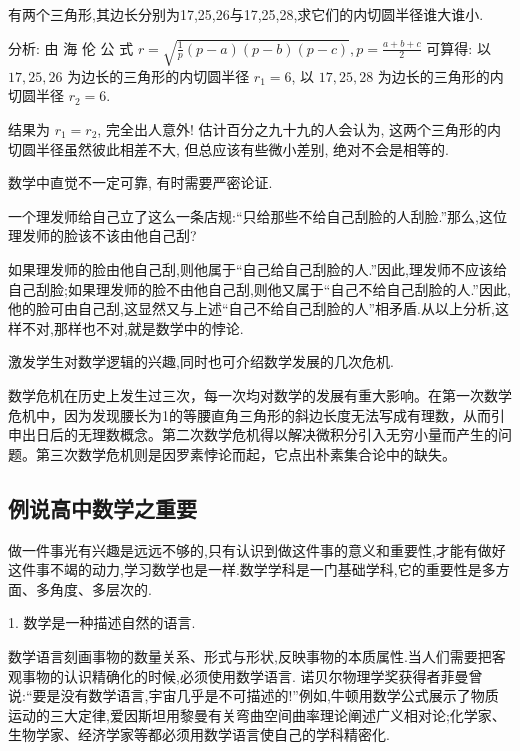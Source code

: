 \begin{example}[几何直觉]
	有两个三角形,其边长分别为17,25,26与17,25,28,求它们的内切圆半径谁大谁小.

	分析: 由 海 伦 公 式 $r=\sqrt{\frac{1}{p}(p-a)(p-b)(p-c)}, p=\frac{a+b+c}{2}$ 可算得: 以 $17,25,26$ 为边长的三角形的内切圆半径 $r_1=6$, 以 $17,25,28$ 为边长的三角形的内切圆半径 $r_2=6$.

	结果为 $r_1=r_2$, 完全出人意外! 估计百分之九十九的人会认为, 这两个三角形的内切圆半径虽然彼此相差不大, 但总应该有些微小差别, 绝对不会是相等的.
\end{example}
\begin{purpose}
	数学中直觉不一定可靠, 有时需要严密论证.
\end{purpose}

\begin{example}[数学悖论]
	一个理发师给自己立了这么一条店规:“只给那些不给自己刮脸的人刮脸.”那么,这位理发师的脸该不该由他自己刮?

	如果理发师的脸由他自己刮,则他属于“自己给自己刮脸的人.”因此,理发师不应该给自己刮脸;如果理发师的脸不由他自己刮,则他又属于“自己不给自己刮脸的人.”因此,他的脸可由自己刮,这显然又与上述“自己不给自己刮脸的人”相矛盾.从以上分析,这样不对,那样也不对,就是数学中的悖论.
\end{example}
\begin{purpose}
	激发学生对数学逻辑的兴趣,同时也可介绍数学发展的几次危机.
\end{purpose}
\begin{note}
	数学危机在历史上发生过三次，每一次均对数学的发展有重大影响。在第一次数学危机中，因为发现腰长为1的等腰直角三角形的斜边长度无法写成有理数，从而引申出日后的无理数概念。第二次数学危机得以解决微积分引入无穷小量而产生的问题。第三次数学危机则是因罗素悖论而起，它点出朴素集合论中的缺失。
\end{note}
\subsection{例说高中数学之重要}
做一件事光有兴趣是远远不够的,只有认识到做这件事的意义和重要性,才能有做好这件事不竭的动力,学习数学也是一样.数学学科是一门基础学科,它的重要性是多方面、多角度、多层次的.

1. 数学是一种描述自然的语言.

数学语言刻画事物的数量关系、形式与形状,反映事物的本质属性.当人们需要把客观事物的认识精确化的时候,必须使用数学语言. 诺贝尔物理学奖获得者菲曼曾说:“要是没有数学语言,宇宙几乎是不可描述的!”例如,牛顿用数学公式展示了物质运动的三大定律,爱因斯坦用黎曼有关弯曲空间曲率理论阐述广义相对论;化学家、生物学家、经济学家等都必须用数学语言使自己的学科精密化.

